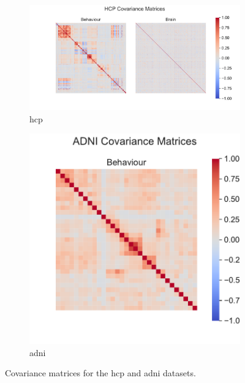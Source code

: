 \begin{figure}
    \centering
    \begin{subfigure}{0.66\linewidth}
        \centering
        \includegraphics[width=\linewidth]{figures/covariance/hcp_covariance}
        \caption{\acrshort{hcp}}
    \end{subfigure}
%
    \begin{subfigure}{0.33\linewidth}
        \centering
        \includegraphics[width=\linewidth]{figures/covariance/adni_covariance}
        \caption{\acrshort{adni}}
    \end{subfigure}
    \caption{Covariance matrices for the \acrshort{hcp} and \acrshort{adni} datasets.}
    \label{fig:covariance-matrices-real}
\end{figure}

